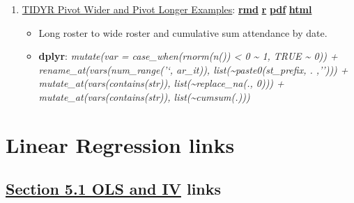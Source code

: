 \documentclass[
]{book}
\providecommand{\tightlist}{%
  \setlength{\itemsep}{0pt}\setlength{\parskip}{0pt}}
\begin{document}
\begin{enumerate}
\def\labelenumi{\arabic{enumi}.}
\tightlist
\item
  \href{https://fanwangecon.github.io/R4Econ/panel/widelong/htmlpdfr/fs_pivotwider.html}{TIDYR Pivot Wider and Pivot Longer Examples}: \href{https://github.com/FanWangEcon/R4Econ/blob/master/panel/widelong//fs_pivotwider.Rmd}{\textbf{rmd}} \textbar{} \href{https://github.com/FanWangEcon/R4Econ/blob/master/panel/widelong/htmlpdfr/fs_pivotwider.R}{\textbf{r}} \textbar{} \href{https://github.com/FanWangEcon/R4Econ/blob/master/panel/widelong/htmlpdfr/fs_pivotwider.pdf}{\textbf{pdf}} \textbar{} \href{https://fanwangecon.github.io/R4Econ/panel/widelong/htmlpdfr/fs_pivotwider.html}{\textbf{html}}

  \begin{itemize}
  \tightlist
  \item
    Long roster to wide roster and cumulative sum attendance by date.
  \item
    \textbf{dplyr}: \emph{mutate(var = case\_when(rnorm(n()) \textless{} 0 \textasciitilde{} 1, TRUE \textasciitilde{} 0)) + rename\_at(vars(num\_range('`, ar\_it)), list(\textasciitilde paste0(st\_prefix, . ,''))) + mutate\_at(vars(contains(str)), list(\textasciitilde replace\_na(., 0))) + mutate\_at(vars(contains(str)), list(\textasciitilde cumsum(.)))}
  \end{itemize}
\end{enumerate}

\hypertarget{linear-regression-links}{%
\section{Linear Regression links}\label{linear-regression-links}}

\hypertarget{section-5.1-ols-and-ivols-and-iv-links}{%
\subsection{\texorpdfstring{\protect\hyperlink{ols-and-iv}{Section 5.1 OLS and IV} links}{Section 5.1 OLS and IV links}}\label{section-5.1-ols-and-ivols-and-iv-links}}
\end{document}
